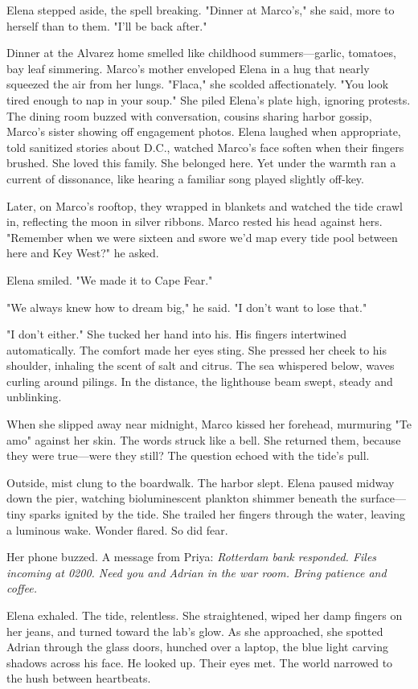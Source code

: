 Elena stepped aside, the spell breaking. "Dinner at Marco's," she said, more to herself than to them. "I'll be back after."

Dinner at the Alvarez home smelled like childhood summers—garlic, tomatoes, bay leaf simmering. Marco's mother enveloped Elena in a hug that nearly squeezed the air from her lungs. "Flaca," she scolded affectionately. "You look tired enough to nap in your soup." She piled Elena's plate high, ignoring protests. The dining room buzzed with conversation, cousins sharing harbor gossip, Marco's sister showing off engagement photos. Elena laughed when appropriate, told sanitized stories about D.C., watched Marco's face soften when their fingers brushed. She loved this family. She belonged here. Yet under the warmth ran a current of dissonance, like hearing a familiar song played slightly off-key.

Later, on Marco's rooftop, they wrapped in blankets and watched the tide crawl in, reflecting the moon in silver ribbons. Marco rested his head against hers. "Remember when we were sixteen and swore we'd map every tide pool between here and Key West?" he asked.

Elena smiled. "We made it to Cape Fear."

"We always knew how to dream big," he said. "I don't want to lose that."

"I don't either." She tucked her hand into his. His fingers intertwined automatically. The comfort made her eyes sting. She pressed her cheek to his shoulder, inhaling the scent of salt and citrus. The sea whispered below, waves curling around pilings. In the distance, the lighthouse beam swept, steady and unblinking.

When she slipped away near midnight, Marco kissed her forehead, murmuring "Te amo" against her skin. The words struck like a bell. She returned them, because they were true—were they still? The question echoed with the tide's pull.

Outside, mist clung to the boardwalk. The harbor slept. Elena paused midway down the pier, watching bioluminescent plankton shimmer beneath the surface—tiny sparks ignited by the tide. She trailed her fingers through the water, leaving a luminous wake. Wonder flared. So did fear.

Her phone buzzed. A message from Priya: \textit{Rotterdam bank responded. Files incoming at 0200. Need you and Adrian in the war room. Bring patience and coffee.}

Elena exhaled. The tide, relentless. She straightened, wiped her damp fingers on her jeans, and turned toward the lab's glow. As she approached, she spotted Adrian through the glass doors, hunched over a laptop, the blue light carving shadows across his face. He looked up. Their eyes met. The world narrowed to the hush between heartbeats.

